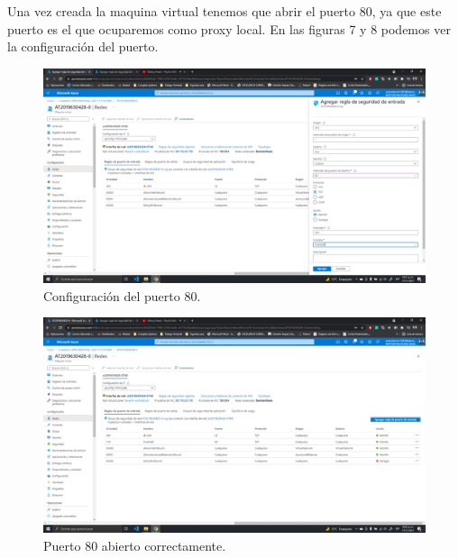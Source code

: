 \documentclass[11pt]{article}
\begin{document}
		Una vez creada la maquina virtual tenemos que abrir el puerto 80, ya que este puerto es el que ocuparemos como proxy local. En las figuras 7 y 8 podemos ver la configuración del puerto.
		\begin{figure}[H]
			\centering
			\includegraphics[scale=0.34]{resources/puerto800.png}
			\caption{Configuración del puerto 80.}\label{fig:picture}
		\end{figure}
		\begin{figure}[H]
			\centering
			\includegraphics[scale=0.34]{resources/puertook0.png}
			\caption{Puerto 80 abierto correctamente.}\label{fig:picture}
		\end{figure}
\end{document}
